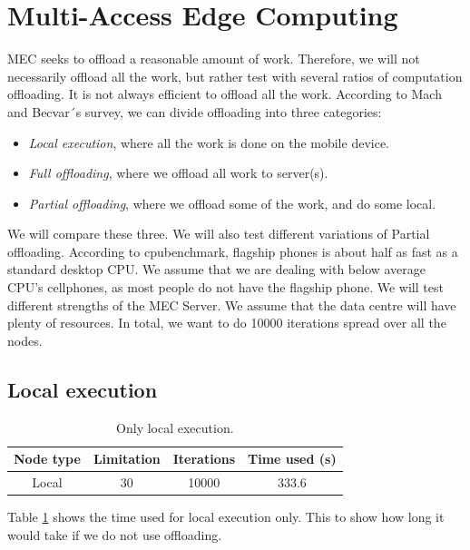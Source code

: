 \section{Multi-Access Edge Computing} \label{section:MEC_evaluation}
MEC seeks to offload a reasonable amount of work. Therefore, we will not necessarily offload all the work, but rather test with several ratios of computation offloading. It is not always efficient to offload all the work. According to Mach and Becvar´s survey\cite{mach_mobile_2017}, we can divide offloading into three categories:
\begin{itemize}
    \item \textit{Local execution}, where all the work is done on the mobile device.
    \item \textit{Full offloading}, where we offload all work to server(s).
    \item \textit{Partial offloading}, where we offload some of the work, and do some local.
\end{itemize}
We will compare these three. We will also test different variations of Partial offloading. According to cpubenchmark\cite{noauthor_passmark_nodate}, flagship phones is about half as fast as a standard desktop CPU. We assume that we are dealing with below average CPU's cellphones, as most people do not have the flagship phone. We will test different strengths of the MEC Server. We assume that the data centre will have plenty of resources. In total, we want to do 10000 iterations spread over all the nodes.

\subsection{Local execution}
\begin{table}[h!]
    \centering
    \begin{tabular}[c]{|c|c|c|c|}
        \hline
        Node type & Limitation & Iterations & Time used (s) \\
        \hline
        \hline
        Local & 30 & 10000 & 333.6 \\
        \hline
    \end{tabular}
    \caption{Only local execution.}
    \label{tab:MEC_local_execution}
\end{table}
Table \ref{tab:MEC_local_execution} shows the time used for local execution only. This to show how long it would take if we do not use offloading.



